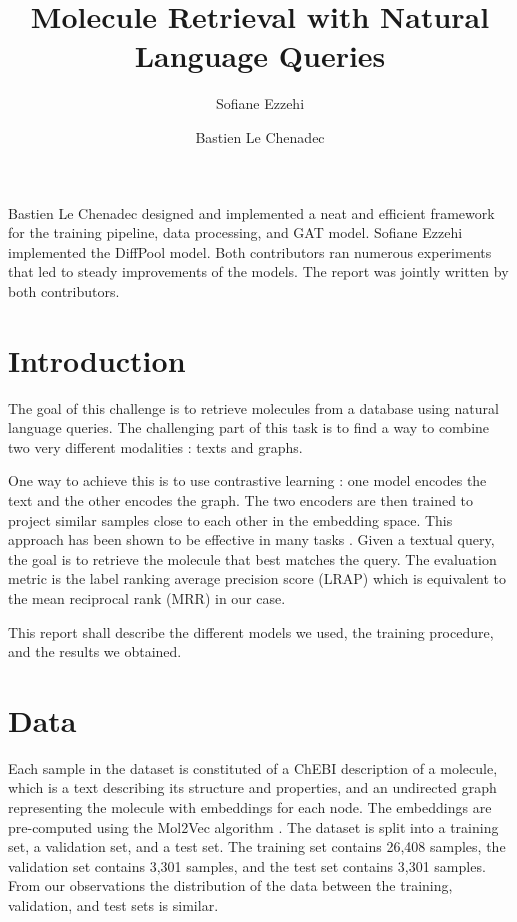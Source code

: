 \documentclass[switch, 11pt]{article}
\title{Molecule Retrieval with Natural Language Queries}
\author[1]{Sofiane Ezzehi}
\author[1]{Bastien Le Chenadec}
\affil[1]{École des Ponts ParisTech}
\begin{document}
\maketitle

\begin{contribstatement}
    Bastien Le Chenadec designed and implemented a neat and efficient framework for the training pipeline, data processing, and GAT model. Sofiane Ezzehi implemented the DiffPool model. Both contributors ran numerous experiments that led to steady improvements of the models. The report was jointly written by both contributors.
\end{contribstatement}
\vspace{0.35cm}

\begin{multicols}{2}
    \section{Introduction}

    The goal of this challenge is to retrieve molecules from a database using natural language queries. The challenging part of this task is to find a way to combine two very different modalities : texts and graphs.

    One way to achieve this is to use contrastive learning : one model encodes the text and the other encodes the graph. The two encoders are then trained to project similar samples close to each other in the embedding space. This approach has been shown to be effective in many tasks \cite{chen-2020,gao-2021}. Given a textual query, the goal is to retrieve the molecule that best matches the query. The evaluation metric is the label ranking average precision score (LRAP) which is equivalent to the mean reciprocal rank (MRR) in our case.

    This report shall describe the different models we used, the training procedure, and the results we obtained.

    \section{Data}

    Each sample in the dataset is constituted of a ChEBI description of a molecule, which is a text describing its structure and properties, and an undirected graph representing the molecule with embeddings for each node. The embeddings are pre-computed using the Mol2Vec algorithm \cite{mol2vec}. The dataset is split into a training set, a validation set, and a test set. The training set contains 26,408 samples, the validation set contains 3,301 samples, and the test set contains 3,301 samples. From our observations the distribution of the data between the training, validation, and test sets is similar.


\end{multicols}
\end{document}

